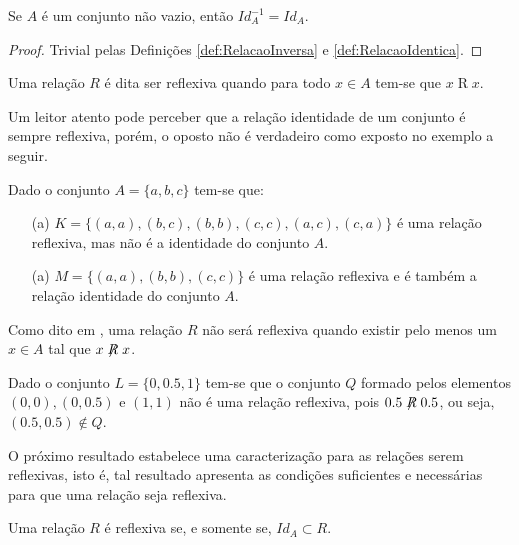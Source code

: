 \begin{proposicao}\label{prop:ComplementarDaRelacaoIdentica}
	Se $A$ é um conjunto não vazio, então $Id_A^{-1} = Id_A$.
\end{proposicao}

\begin{proof}
	Trivial pelas Definições \ref{def:RelacaoInversa} e \ref{def:RelacaoIdentica}.
\end{proof}

\begin{definicao}\label{def:RelacaoReflexiva}
	Uma relação $R$ é dita ser reflexiva quando para todo $x \in A$ tem-se que $x \mathrel{R} x$.
\end{definicao}

Um leitor atento pode perceber que a relação identidade de um conjunto é sempre reflexiva, porém, o oposto não é verdadeiro como exposto no exemplo a seguir.

\begin{exemplo}
	Dado o conjunto $A = \{a, b, c\}$ tem-se que: 
	\begin{itemize}
		\item[(a)] $K = \{(a, a), (b, c), (b, b), (c, c), (a, c), (c, a)\}$ é uma relação reflexiva, mas não é a identidade do conjunto $A$.
		\item[(a)] $M = \{(a, a), (b, b), (c, c) \}$ é uma relação reflexiva e é  também a relação identidade do conjunto $A$.
	\end{itemize}
\end{exemplo}

Como dito em \cite{abe1991-TC}, uma relação $R$ não será reflexiva quando existir pelo menos um $x \in A$ tal que $x\centernot{R} x$.

\begin{exemplo}
	Dado o conjunto $L = \{0, 0.5, 1\}$ tem-se que o conjunto $Q$ formado pelos elementos $(0,0), (0,0.5)$ e $(1, 1)$ não é uma relação reflexiva, pois $0.5\centernot{R} 0.5$, ou seja, $(0.5, 0.5) \notin Q$.
\end{exemplo}

O próximo resultado estabelece uma caracterização para as relações serem reflexivas, isto é, tal resultado apresenta as condições suficientes e necessárias para que uma relação seja reflexiva.

\begin{teorema}\label{teo:CaracterizacaoRelacaoReflexivda}
	Uma relação $R$ é reflexiva se, e somente se, $Id_A \subset R$.
\end{teorema}

